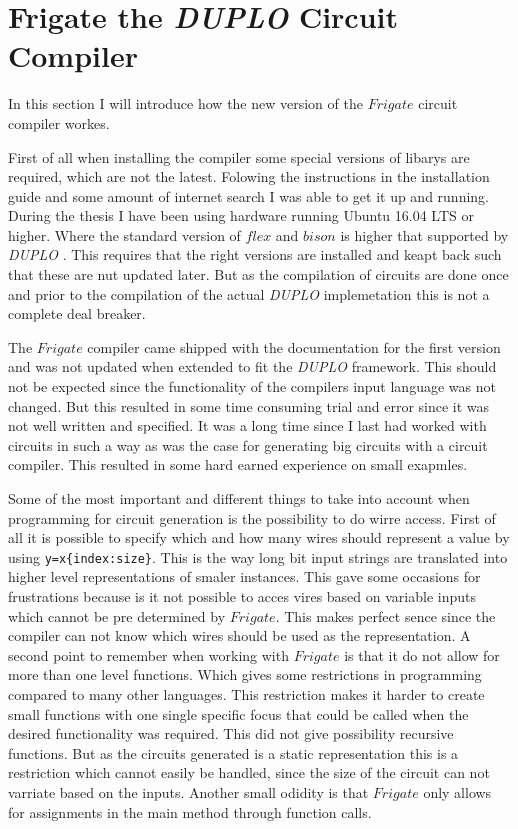 \documentclass[twoside,11pt,openright]{report}
\newcommand{\DUPLO}{\textit{DUPLO} }
\begin{document}
\section{Frigate the \DUPLO Circuit Compiler}
\label{sec:frigate}
In this section I will introduce how the new version of the $Frigate$ circuit compiler workes.

First of all when installing the compiler some special versions of libarys are required, which are not the latest. Folowing the instructions in the installation guide and some amount of internet search I was able to get it up and running. During the thesis I have been using hardware running Ubuntu 16.04 LTS or higher. Where the standard version of $flex$ and $bison$ is higher that supported by \DUPLO. This requires that the right versions are installed and keapt back such that these are nut updated later. But as the compilation of circuits are done once and prior to the compilation of the actual \DUPLO implemetation this is not a complete deal breaker.

The $Frigate$ compiler came shipped with the documentation for the first version and was not updated when extended to fit the \DUPLO framework. This should not be expected since the functionality of the compilers input language was not changed. But this resulted in some time consuming trial and error since it was not well written and specified. It was a long time since I last had worked with circuits in such a way as was the case for generating big circuits with a circuit compiler. This resulted in some hard earned experience on small exapmles.

Some of the most important and different things to take into account when programming for circuit generation is the possibility to do wirre access. First of all it is possible to specify which and how many wires should represent a value by using \verb|y=x{index:size}|. This is the way long bit input strings are translated into higher level representations of smaler instances. This gave some occasions for frustrations because is it not possible to acces vires based on variable inputs which cannot be pre determined by $Frigate$. This makes perfect sence since the compiler can not know which wires should be used as the representation.
A second point to remember when working with $Frigate$ is that it do not allow for more than one level functions. Which gives some restrictions in programming compared to many other languages. This restriction makes it harder to create small functions with one single specific focus that could be called when the desired functionality was required. This did not give possibility recursive functions. But as the circuits generated is a static representation this is a restriction which cannot easily be handled, since the size of the circuit can not varriate based on the inputs. Another small odidity is that $Frigate$ only allows for assignments in the main method through function calls.
\end{document}
